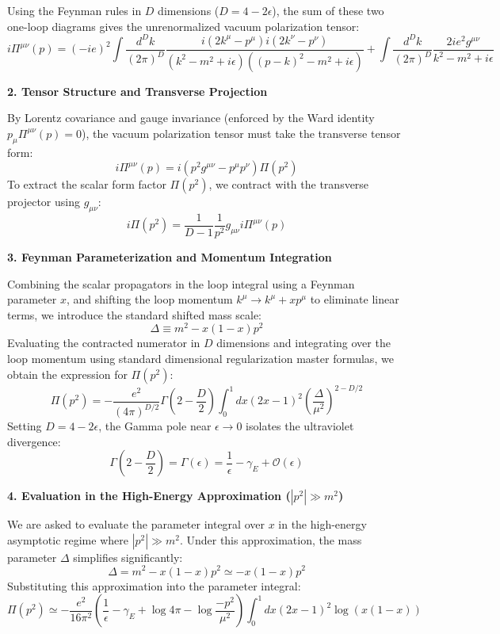 Using the Feynman rules in $D$ dimensions ($D = 4 - 2\epsilon$), the sum of these two one-loop diagrams gives the unrenormalized vacuum polarization tensor:
\[
    i\Pi^{\mu\nu}(p) = (-ie)^2 \int \frac{d^D k}{(2\pi)^D} \frac{i(2k^\mu - p^\mu) i(2k^\nu - p^\nu)}{(k^2 - m^2 + i\epsilon)((p-k)^2 - m^2 + i\epsilon)} + \int \frac{d^D k}{(2\pi)^D} \frac{2ie^2 g^{\mu\nu}}{k^2 - m^2 + i\epsilon}
\]

\textbf{2. Tensor Structure and Transverse Projection}

By Lorentz covariance and gauge invariance (enforced by the Ward identity $p_\mu \Pi^{\mu\nu}(p) = 0$), the vacuum polarization tensor must take the transverse tensor form:
\[
    i\Pi^{\mu\nu}(p) = i(p^2 g^{\mu\nu} - p^\mu p^\nu) \Pi(p^2)
\]
To extract the scalar form factor $\Pi(p^2)$, we contract with the transverse projector using $g_{\mu\nu}$:
\[
    i\Pi(p^2) = \frac{1}{D-1} \frac{1}{p^2} g_{\mu\nu} i\Pi^{\mu\nu}(p)
\]

\textbf{3. Feynman Parameterization and Momentum Integration}

Combining the scalar propagators in the loop integral using a Feynman parameter $x$, and shifting the loop momentum $k^\mu \to k^\mu + x p^\mu$ to eliminate linear terms, we introduce the standard shifted mass scale:
\[
    \Delta \equiv m^2 - x(1-x)p^2
\]
Evaluating the contracted numerator in $D$ dimensions and integrating over the loop momentum using standard dimensional regularization master formulas, we obtain the expression for $\Pi(p^2)$:
\[
    \Pi(p^2) = -\frac{e^2}{(4\pi)^{D/2}} \Gamma\left(2 - \frac{D}{2}\right) \int_0^1 dx (2x - 1)^2 \left( \frac{\Delta}{\mu^2} \right)^{2 - D/2}
\]
Setting $D = 4 - 2\epsilon$, the Gamma pole near $\epsilon \to 0$ isolates the ultraviolet divergence:
\[
    \Gamma\left(2 - \frac{D}{2}\right) = \Gamma(\epsilon) = \frac{1}{\epsilon} - \gamma_E + \mathcal{O}(\epsilon)
\]

\textbf{4. Evaluation in the High-Energy Approximation ($|p^2| \gg m^2$)}

We are asked to evaluate the parameter integral over $x$ in the high-energy asymptotic regime where $|p^2| \gg m^2$. Under this approximation, the mass parameter $\Delta$ simplifies significantly:
\[
    \Delta = m^2 - x(1-x)p^2 \simeq -x(1-x)p^2
\]
Substituting this approximation into the parameter integral:
\[
    \Pi(p^2) \simeq -\frac{e^2}{16\pi^2} \left( \frac{1}{\epsilon} - \gamma_E + \log 4\pi - \log \frac{-p^2}{\mu^2} \right) \int_0^1 dx (2x - 1)^2 \log\left( x(1-x) \right)
\]

